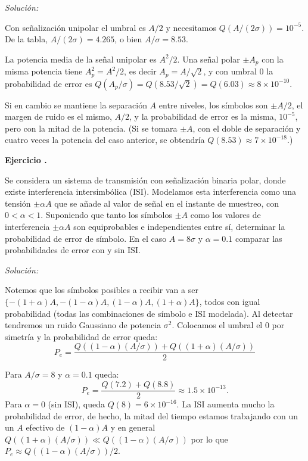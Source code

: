 \documentclass[a4paper,11pt]{article}
\newcounter{numejer}[section]
\newenvironment{ejercicio}[1][]{
\refstepcounter{numejer}
\noindent \large \textbf{Ejercicio \arabic{section}.\arabic{numejer}} \ifthenelse{\equal{#1}{}}{}{\emph{(#1)}}

\smallskip
}{
\bigskip
}
\newenvironment{solucion}[1][]{
\noindent \large \textsl{Solución:} \ifthenelse{\equal{#1}{}}{}{\emph{(#1)}}

\smallskip
}{
\bigskip
}
\begin{document}
\begin{solucion}
Con señalización unipolar el umbral es $A/2$ y necesitamos $Q(A/(2\sigma)) = 10^{-5}$. De la tabla, $A/(2\sigma) = 4.265$, o bien $A/\sigma = 8.53$.

La potencia media de la señal unipolar es $A^2/2$. Una señal polar $\pm A_p$ con la misma potencia tiene $A_p^2=A^2/2$, es decir $A_p=A/\sqrt2$, y con umbral $0$ la probabilidad de error es $Q(A_p/\sigma)=Q(8.53/\sqrt2)=Q(6.03)\approx 8\times10^{-10}$.

Si en cambio se mantiene la separación $A$ entre niveles, los símbolos son $\pm A/2$, el margen de ruido es el mismo, $A/2$, y la probabilidad de error es la misma, $10^{-5}$, pero con la mitad de la potencia. (Si se tomara $\pm A$, con el doble de separación y cuatro veces la potencia del caso anterior, se obtendría $Q(8.53)\approx 7\times10^{-18}$.)
\end{solucion}


\begin{ejercicio}
Se considera un sistema de transmisión con señalización binaria polar, donde existe interferencia intersimbólica (ISI). Modelamos esta interferencia como una tensión $\pm \alpha A$ que se añade al valor de señal en el instante de muestreo, con $0 < \alpha < 1$. Suponiendo que tanto los símbolos $\pm A$ como los valores de interferencia $\pm \alpha A$ son equiprobables e independientes entre sí, determinar la probabilidad de error de símbolo. En el caso $A=8\sigma$ y $\alpha=0.1$ comparar las probabilidades de error con y sin ISI.
\end{ejercicio}

\begin{solucion}
        Notemos que los símbolos posibles a recibir van a ser $\{-(1+\alpha)A, -(1-\alpha)A, (1-\alpha)A, (1+\alpha)A\}$, todos con igual probabilidad (todas las combinaciones de símbolo e ISI modelada). Al detectar tendremos un ruido Gaussiano de potencia $\sigma^2$. Colocamos el umbral el $0$ por simetría y la probabilidad de error queda:
        \begin{equation*}
                P_e = \frac{Q((1-\alpha)(A/\sigma))+Q((1+\alpha)(A/\sigma))}{2}
        \end{equation*}

        Para $A/\sigma=8$ y $\alpha=0.1$ queda:
        \begin{equation*}
                P_e = \frac{Q(7.2)+Q(8.8)}{2} \approx 1.5\times 10^{-13}.
        \end{equation*}
        Para $\alpha=0$ (sin ISI), queda $Q(8)= 6\times 10^{-16}$. La ISI aumenta mucho la probabilidad de error, de hecho, la mitad del tiempo estamos trabajando con un un $A$ efectivo de $(1-\alpha)A$ y en general $Q((1+\alpha)(A/\sigma)) \ll Q((1-\alpha)(A/\sigma))$ por lo que $P_e \approx Q((1-\alpha)(A/\sigma))/2$.
\end{solucion}
\end{document}
